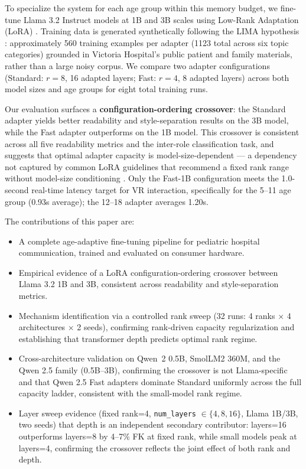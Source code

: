 \documentclass[AMA,Times1COL]{WileyNJDv5} %
\begin{document}
To specialize the system for each age group within this memory budget, we fine-tune Llama 3.2 Instruct models \cite{dubey2024llama3} at 1B and 3B scales using Low-Rank Adaptation (LoRA) \cite{hu2022lora}. Training data is generated synthetically following the LIMA hypothesis \cite{zhou2023lima}: approximately 560 training examples per adapter (1123 total across six topic categories) grounded in Victoria Hospital's public patient and family materials, rather than a large noisy corpus. We compare two adapter configurations (Standard: $r = 8$, 16 adapted layers; Fast: $r = 4$, 8 adapted layers) across both model sizes and age groups for eight total training runs.

Our evaluation surfaces a \textbf{configuration-ordering crossover}: the Standard adapter yields better readability and style-separation results on the 3B model, while the Fast adapter outperforms on the 1B model. This crossover is consistent across all five readability metrics and the inter-role classification task, and suggests that optimal adapter capacity is model-size-dependent --- a dependency not captured by common LoRA guidelines that recommend a fixed rank range without model-size conditioning \cite{biderman2024lora}. Only the Fast-1B configuration meets the 1.0-second real-time latency target for VR interaction, specifically for the 5--11 age group (0.93s average); the 12--18 adapter averages 1.20s.

\medskip\noindent The contributions of this paper are:
\begin{itemize}
    \item A complete age-adaptive fine-tuning pipeline for pediatric hospital communication, trained and evaluated on consumer hardware.
    \item Empirical evidence of a LoRA configuration-ordering crossover between Llama 3.2 1B and 3B, consistent across readability and style-separation metrics.
    \item Mechanism identification via a controlled rank sweep (32 runs: 4 ranks $\times$ 4 architectures $\times$ 2 seeds), confirming rank-driven capacity regularization and establishing that transformer depth predicts optimal rank regime.
    \item Cross-architecture validation on Qwen~2 0.5B, SmolLM2 360M, and the Qwen 2.5 family (0.5B--3B), confirming the crossover is not Llama-specific and that Qwen 2.5 Fast adapters dominate Standard uniformly across the full capacity ladder, consistent with the small-model rank regime.
    \item Layer sweep evidence (fixed rank=4, \texttt{num\_layers} $\in \{4, 8, 16\}$, Llama 1B/3B, two seeds) that depth is an independent secondary contributor: layers=16 outperforms layers=8 by 4--7\% FK at fixed rank, while small models peak at layers=4, confirming the crossover reflects the joint effect of both rank and depth.
\end{itemize}
\end{document}
